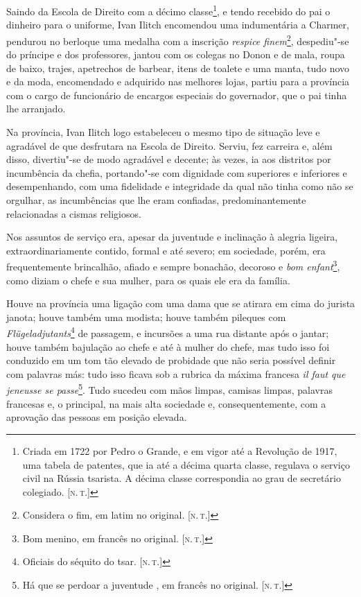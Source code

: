 Saindo da Escola de Direito com a décimo classe\footnote{Criada em 1722
  por Pedro o Grande, e em vigor até a Revolução de 1917, uma tabela de
  patentes, que ia até a décima quarta classe, regulava o serviço civil
  na Rússia tsarista. A décima classe correspondia ao grau de secretário
  colegiado. {[}\textsc{n.\,t.}{]}}, e tendo recebido do pai o dinheiro para o
uniforme, Ivan Ilitch encomendou uma indumentária a Charmer, pendurou no
berloque uma medalha com a inscrição \emph{respice finem}\footnote{Considera
  o fim, em latim no original. {[}\textsc{n.\,t.}{]}}, despediu"-se do
príncipe e dos professores, jantou com os colegas no Donon e de mala,
roupa de baixo, trajes, apetrechos de barbear, itens de toalete e uma
manta, tudo novo e da moda, encomendado e adquirido nas melhores lojas,
partiu para a província com o cargo de funcionário de encargos especiais
do governador, que o pai tinha lhe arranjado.

Na província, Ivan Ilitch logo estabeleceu o mesmo tipo de situação leve
e agradável de que desfrutara na Escola de Direito. Serviu, fez carreira
e, além disso, divertiu"-se de modo agradável e decente; às vezes, ia aos
distritos por incumbência da chefia, portando"-se com dignidade com
superiores e inferiores e desempenhando, com uma fidelidade e
integridade da qual não tinha como não se orgulhar, as incumbências que
lhe eram confiadas, predominantemente relacionadas a cismas religiosos.

Nos assuntos de serviço era, apesar da juventude e inclinação à alegria
ligeira, extraordinariamente contido, formal e até severo; em sociedade,
porém, era frequentemente brincalhão, afiado e sempre bonachão, decoroso
e \emph{bom enfant}\footnote{Bom menino, em francês no original. {[}\textsc{n.\,t.}{]}}, como diziam o chefe e sua mulher, para os quais ele era
da família.

Houve na província uma ligação com uma dama que se atirara em cima do
jurista janota; houve também uma modista; houve também pileques com
\emph{Flügeladjutants}\footnote{Oficiais do séquito do tsar. {[}\textsc{n.\,t.}{]}}
de passagem, e incursões a uma rua distante após o jantar; houve também
bajulação ao chefe e até à mulher do chefe, mas tudo isso foi conduzido
em um tom tão elevado de probidade que não seria possível definir com
palavras más: tudo isso ficava sob a rubrica da máxima francesa \emph{il
faut que jeneusse se passe}\footnote{Há que se perdoar a juventude , em
  francês no original. {[}\textsc{n.\,t.}{]}}. Tudo sucedeu com mãos limpas,
camisas limpas, palavras francesas e, o principal, na mais alta
sociedade e, consequentemente, com a aprovação das pessoas em posição
elevada.

